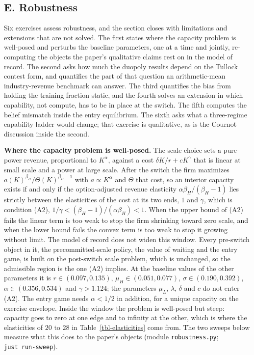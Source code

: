\documentclass[
  11pt,
  letterpaper,
]{scrartcl}
\begin{document}
\subsection*{E. Robustness}\label{e.-robustness}

Six exercises assess robustness, and the section closes with limitations
and extensions that are not solved. The first states where the capacity
problem is well-posed and perturbs the baseline parameters, one at a
time and jointly, re-computing the objects the paper's qualitative
claims rest on in the model of record. The second asks how much the
duopoly results depend on the Tullock contest form, and quantifies the
part of that question an arithmetic-mean industry-revenue benchmark can
answer. The third quantifies the bias from holding the training fraction
static, and the fourth solves an extension in which capability, not
compute, has to be in place at the switch. The fifth computes the belief
mismatch inside the entry equilibrium. The sixth asks what a
three-regime capability ladder would change; that exercise is
qualitative, as is the Cournot discussion inside the second.

\textbf{Where the capacity problem is well-posed.} The scale choice sets
a pure-power revenue, proportional to \(K^\alpha\), against a cost
\(\delta K/r + cK^\gamma\) that is linear at small scale and a power at
large scale. After the switch the firm maximizes
\(a(K)^{\beta_H}/\Theta(K)^{\beta_H - 1}\) with \(a \propto K^\alpha\)
and \(\Theta\) that cost, so an interior capacity exists if and only if
the option-adjusted revenue elasticity \(\alpha\beta_H/(\beta_H-1)\)
lies strictly between the elasticities of the cost at its two ends,
\(1\) and \(\gamma\), which is condition (A2),
\(1/\gamma < (\beta_H-1)/(\alpha\beta_H) < 1\). When the upper bound of
(A2) fails the linear term is too weak to stop the firm shrinking toward
zero scale, and when the lower bound fails the convex term is too weak
to stop it growing without limit. The model of record does not widen
this window. Every pre-switch object in it, the precommitted-scale
policy, the value of waiting and the entry game, is built on the
post-switch scale problem, which is unchanged, so the admissible region
is the one (A2) implies. At the baseline values of the other parameters
it is \(r \in (0.097, 0.135)\), \(\mu_H \in (0.051, 0.077)\),
\(\sigma \in (0.190, 0.392)\), \(\alpha \in (0.356, 0.534)\) and
\(\gamma > 1.124\); the parameters \(\mu_L\), \(\lambda\), \(\delta\)
and \(c\) do not enter (A2). The entry game needs \(\alpha < 1/2\) in
addition, for a unique capacity on the exercise envelope. Inside the
window the problem is well-posed but steep: capacity goes to zero at one
edge and to infinity at the other, which is where the elasticities of
\(20\) to \(28\) in Table~\ref{tbl-elasticities} come from. The two
sweeps below measure what this does to the paper's objects (module
\texttt{robustness.py}; \texttt{just\ run-sweep}).
\end{document}
